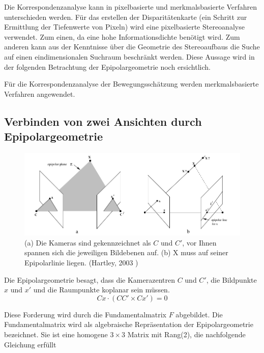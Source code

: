 Die Korrespondenzanalyse kann in pixelbasierte und merkmalsbasierte Verfahren unterschieden werden. Für das erstellen der Disparitätenkarte (ein Schritt zur Ermittlung der Tiefenwerte von Pixeln) wird eine pixelbasierte Stereoanalyse verwendet. Zum einen, da eine hohe Informationsdichte benötigt wird. Zum anderen kann aus der Kenntnisse über die Geometrie des Stereoaufbaus die Suche auf einen eindimensionalen Suchraum beschränkt werden. Diese Aussage wird in der folgenden Betrachtung der Epipolargeometrie noch ersichtlich.
\newline

Für die Korrespondenzanalyse der Bewegungsschätzung werden merkmalsbasierte Verfahren angewendet.

\subsection{Verbinden von zwei Ansichten durch Epipolargeometrie}
\begin{center}
    \begin{figure}[!h]
      \centering
      \includegraphics[width=\textwidth]{pictures/epipane_01.png}
      \caption[Bildebenen mit Epipolarlinien]{(a) Die Kameras sind gekennzeichnet als $C$ und $C'$, vor Ihnen spannen sich die jeweiligen Bildebenen auf. 
      (b) X muss auf seiner Epipolarlinie liegen. (Hartley, 2003 \cite{Hartley:MVG})}
      \label{fig:epigem1}
    \end{figure}
\end{center}

Die Epipolargeometrie besagt, dass die Kamerazentren $C$ und $C'$, die Bildpunkte $x$ und $x'$ und die Raumpunkte koplanar sein müssen.
%
\begin{equation}
  Cx\cdot(C C' \times C x') = 0
  \label{eq:epi_const}
\end{equation}

Diese Forderung wird durch die Fundamentalmatrix $F$ abgebildet. Die Fundamentalmatrix wird als algebraische Repräsentation der Epipolargeometrie bezeichnet. Sie ist eine homogene $3 \times 3$ Matrix mit Rang(2), die nachfolgende Gleichung erfüllt \cite{Hartley:MVG} 

